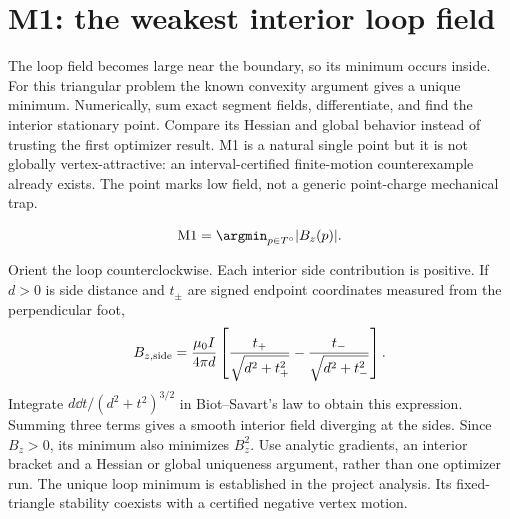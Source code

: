 \documentclass[11pt,oneside,openany]{book}
\begin{document}
\section{M1: the weakest interior loop field}\label{sec:slide23}

The loop field becomes large near the boundary, so its minimum occurs inside. For this triangular problem the known convexity argument gives a unique minimum. Numerically, sum exact segment fields, differentiate, and find the interior stationary point. Compare its Hessian and global behavior instead of trusting the first optimizer result. M1 is a natural single point but it is not globally vertex-attractive: an interval-certified finite-motion counterexample already exists. The point marks low field, not a generic point-charge mechanical trap.


\[\mathrm{M1}=\argmin_{p\in T^\circ}|B_z(p)|.\]



Orient the loop counterclockwise. Each interior side contribution is
positive. If $d>0$ is side distance and $t_\pm$ are signed endpoint
coordinates measured from the perpendicular foot,
\[
B_{z,\rm side}=\frac{\mu_0I}{4\pi d}
\left[\frac{t_+}{\sqrt{d^2+t_+^2}}-
\frac{t_-}{\sqrt{d^2+t_-^2}}\right].
\]
Integrate $d\dd t/(d^2+t^2)^{3/2}$ in Biot--Savart's law to obtain
this expression. Summing three terms gives a smooth interior field
diverging at the sides. Since $B_z>0$, its minimum also minimizes
$B_z^2$.
Use analytic gradients, an interior bracket and a Hessian or global
uniqueness argument, rather than one optimizer run.
The unique loop minimum is established in the project analysis.
Its fixed-triangle stability coexists with a certified negative
vertex motion.
\end{document}
